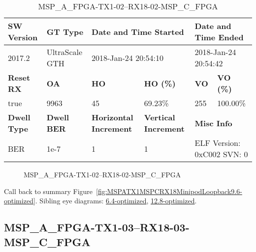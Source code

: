 \begin{table}[h]
\centering
\caption{MSP\_A\_FPGA-TX1-02--RX18-02-MSP\_C\_FPGA}
\label{tab:MSPAFPGATX102RX1802MSPCFPGA9.6-optimized}
\begin{tabular}{@{}|l|l|l|l|l|l|@{}}
\toprule
\textbf{SW Version}                & \textbf{GT Type}   & \multicolumn{2}{l|}{\textbf{Date and Time Started}}            & \multicolumn{2}{l|}{\textbf{Date and Time Ended}}        \\ \midrule
2017.2                       & UltraScale GTH          & \multicolumn{2}{l|}{2018-Jan-24 20:54:10}                   & \multicolumn{2}{l|}{2018-Jan-24 20:54:42}               \\ \midrule
\textbf{Reset RX}                  & \textbf{OA} & \textbf{HO}   & \textbf{HO (\%)} & \textbf{VO} & \textbf{VO (\%)} \\ \midrule
true & 9963        & 45          & 69.23\%        & 255        & 100.00\%       \\ \midrule
\textbf{Dwell Type}                & \textbf{Dwell BER} & \textbf{Horizontal Increment} & \textbf{Vertical Increment}    & \multicolumn{2}{l|}{\textbf{Misc Info}}                  \\ \midrule
BER                            & 1e-7        & 1        & 1           & \multicolumn{2}{l|}{ELF Version: 0xC002 SVN: 0}                         \\ \bottomrule
\end{tabular}
\end{table}

\begin{figure}[h]
\caption{MSP\_A\_FPGA-TX1-02--RX18-02-MSP\_C\_FPGA} \label{fig:MSPAFPGATX102RX1802MSPCFPGA9.6-optimized}
\end{figure}

Call back to summary Figure~\ref{fig:MSPATX1MSPCRX18MinipodLoopback9.6-optimized}.
Sibling eye diagrams: \hyperref[sec:MSPAFPGATX102RX1802MSPCFPGA6.4-optimized]{6.4-optimized}, \hyperref[sec:MSPAFPGATX102RX1802MSPCFPGA12.8-optimized]{12.8-optimized}.

\clearpage
\newpage


\subsection{MSP\_A\_FPGA-TX1-03--RX18-03-MSP\_C\_FPGA}\label{sec:MSPAFPGATX103RX1803MSPCFPGA9.6-optimized}

